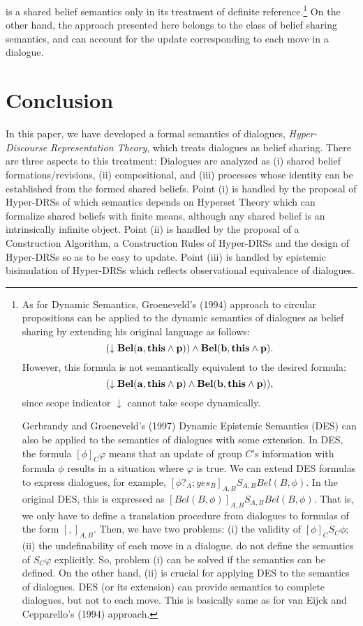 is a shared belief semantics only in its treatment of definite reference.\<\footnote{
As for Dynamic Semantics, Groeneveld's (1994) approach to circular propositions can be applied to the dynamic semantics of dialogues as belief sharing by extending his original language as follows:
$$(\downarrow\bf{Bel(a,this\wedge p))\wedge Bel(b,this\wedge p)}.$$
However, this formula is not semantically equivalent to the desired formula:
$$(\downarrow\bf{Bel(a,this\wedge p)\wedge Bel(b,this\wedge p))},$$
since scope indicator $\downarrow$ cannot take scope dynamically.
\par
Gerbrandy and Groeneveld's (1997) Dynamic Epistemic Semantics (DES) can also be applied to the semantics of dialogues with some extension.
In DES, the formula $[\phi]_C\varphi$ means that an update of group $C$'s information with formula $\phi$ results in a situation where $\varphi$ is true.
We can extend DES formulas to express dialogues, for example, $[\phi?_A;yes_B]_{A,B}S_{A,B}Bel(B,\phi)$.
In the original DES, this is expressed as $[Bel(B,\phi)]_{A,B}S_{A,B}Bel(B,\phi)$.
That is, we only have to define a translation procedure from dialogues to formulas of the form $[,]_{A,B}$.
Then, we have two problems: (i) the validity of $[\phi]_CS_C\phi$; (ii) the undefinability of each move in a dialogue.
\cite{GG97} do not define the semantics of $S_C\varphi$ explicitly.
So, problem (i) can be solved if the semantics can be defined.
On the other hand, (ii) is crucial for applying DES to the semantics of dialogues.
DES (or its extension) can provide semantics to complete dialogues, but not to each move.
This is basically same as for van Eijck and Cepparello's (1994) approach.
}
On the other hand, the approach presented here belongs to the class of belief sharing semantics, and can account for the update corresponding to each move in a dialogue.
\section{Conclusion}\label{conc}
In this paper, we have developed a formal semantics of dialogues, {\it Hyper-Discourse Representation Theory}, which treats dialogues as belief sharing.
There are three aspects to this treatment: Dialogues are analyzed as (i) shared belief formations/revisions, (ii) compositional, and (iii) processes whose identity can be established from the formed shared beliefs.
Point (i) is handled by the proposal of Hyper-DRSs of which semantics depends on Hyperset Theory which can formalize shared beliefs with finite means, although any shared belief is an intrinsically infinite object.
Point (ii) is handled by the proposal of a Construction Algorithm, a Construction Rules of Hyper-DRSs and the design of Hyper-DRSs so as to be easy to update.
Point (iii) is handled by epistemic bisimulation of Hyper-DRSs which reflects observational equivalence of dialogues.
